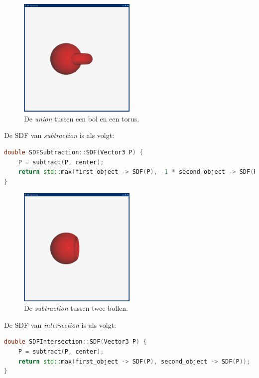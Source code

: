 \documentclass[12pt, a4paper]{article}
\begin{document}
\begin{figure}[H]
    \centering
    \includegraphics[width=0.50\textwidth]{renders/union.png}
    \caption{De \emph{union} tussen een bol en een torus.}
    \label{fig:union}
\end{figure}

De SDF van \emph{subtraction} is als volgt:

\begin{lstlisting}[language=C++]
double SDFSubtraction::SDF(Vector3 P) {
    P = subtract(P, center);
    return std::max(first_object -> SDF(P), -1 * second_object -> SDF(P));
}
\end{lstlisting}


\begin{figure}[H]
    \centering
    \includegraphics[width=0.50\textwidth]{renders/subtraction.png}
    \caption{De \emph{subtraction} tussen twee bollen.}
    \label{fig:subtraction}
\end{figure}

De SDF van \emph{intersection} is als volgt:

\begin{lstlisting}[language=C++]
double SDFIntersection::SDF(Vector3 P) {
    P = subtract(P, center);
    return std::max(first_object -> SDF(P), second_object -> SDF(P));
}
\end{lstlisting}
\end{document}
